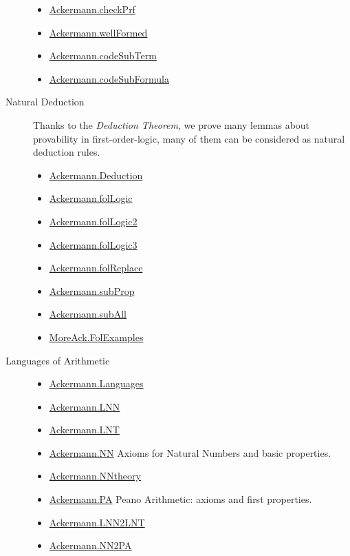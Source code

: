 \begin{description}
\begin{itemize}
\item \href{../theories/html/hydras.Ackermann.checkPrf.html}{Ackermann.checkPrf}
\item \href{../theories/html/hydras.Ackermann.wellFormed.html}{Ackermann.wellFormed}
\item \href{../theories/html/hydras.Ackermann.codeSubTerm.html}{Ackermann.codeSubTerm}
\item \href{../theories/html/hydras.Ackermann.codeSubFormula.html}{Ackermann.codeSubFormula}


  \end{itemize}

\item[Natural Deduction]
 \mbox{}
Thanks to the \emph{Deduction Theorem}, we prove many 
lemmas about provability in first-order-logic, many of them can be considered as natural deduction rules.

\begin{itemize}
\item \href{../theories/html/hydras.Ackermann.Deduction.html}{Ackermann.Deduction}
\item \href{../theories/html/hydras.Ackermann.folLogic.html}{Ackermann.folLogic}
\item \href{../theories/html/hydras.Ackermann.folLogic2.html}{Ackermann.folLogic2}
\item \href{../theories/html/hydras.Ackermann.folLogic3.html}{Ackermann.folLogic3}
\item \href{../theories/html/hydras.Ackermann.folReplace.html}{Ackermann.folReplace}
\item \href{../theories/html/hydras.Ackermann.subProp.html}{Ackermann.subProp}
\item \href{../theories/html/hydras.Ackermann.subAll.html}{Ackermann.subAll}
 \item  \href{../theories/html/hydras.MoreAck.FolExamples.html}{MoreAck.FolExamples}
\end{itemize}

\item [Languages of Arithmetic]
\mbox{}

\begin{itemize}
\item \href{../theories/html/hydras.Ackermann.Languages.html}{Ackermann.Languages}
\item \href{../theories/html/hydras.Ackermann.LNN.html}{Ackermann.LNN}
\item \href{../theories/html/hydras.Ackermann.LNT.html}{Ackermann.LNT}
\item \href{../theories/html/hydras.Ackermann.NN.html}{Ackermann.NN} Axioms for Natural Numbers and basic properties.
\item \href{../theories/html/hydras.Ackermann.NNtheory.html}{Ackermann.NNtheory}
\item \href{../theories/html/hydras.Ackermann.PA.html}{Ackermann.PA} Peano Arithmetic: axioms  and first properties.
\item \href{../theories/html/hydras.Ackermann.LNN2LNT.html}{Ackermann.LNN2LNT}
\item \href{../theories/html/hydras.Ackermann.NN2PA.html}{Ackermann.NN2PA}


\end{itemize}
\end{description}
